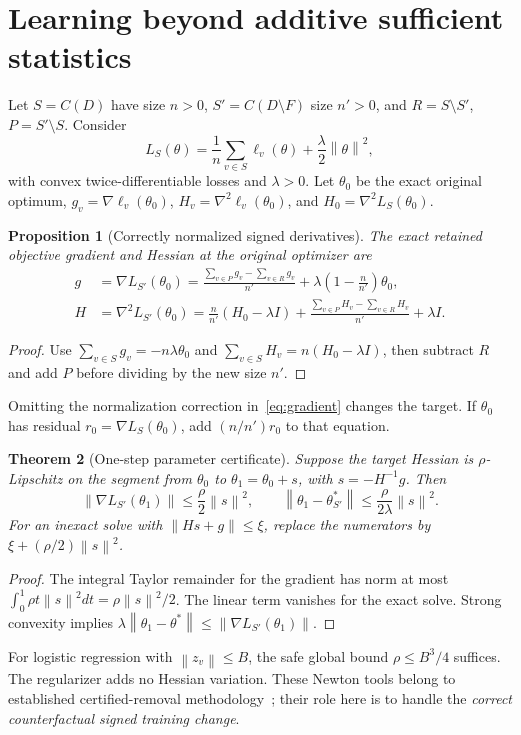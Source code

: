 \documentclass[11pt,a4paper]{article}
\newtheorem{theorem}{Theorem}[section]
\newtheorem{proposition}[theorem]{Proposition}
\theoremstyle{definition}\newtheorem{definition}[theorem]{Definition}
\newcommand{\norm}[1]{\left\lVert #1\right\rVert}
\newcommand{\minus}{\setminus}
\begin{document}
\section{Learning beyond additive sufficient statistics}\label{sec:convex}
Let $S=C(D)$ have size $n>0$, $S'=C(D\minus F)$ size $n'>0$, and $R=S\minus S'$, $P=S'\minus S$. Consider
\[
 L_S(\theta)=\frac1n\sum_{v\in S}\ell_v(\theta)+\frac\lambda2\norm\theta^2,
\]
with convex twice-differentiable losses and $\lambda>0$. Let $\theta_0$ be the exact original optimum, $g_v=\nabla\ell_v(\theta_0)$, $H_v=\nabla^2\ell_v(\theta_0)$, and $H_0=\nabla^2L_S(\theta_0)$.

\begin{proposition}[Correctly normalized signed derivatives]\label{prop:derivatives}
The exact retained objective gradient and Hessian at the original optimizer are
\begin{align}
 g&=\nabla L_{S'}(\theta_0)
 =\frac{\sum_{v\in P}g_v-\sum_{v\in R}g_v}{n'}
   +\lambda\left(1-\frac n{n'}\right)\theta_0,\label{eq:gradient}\\
 H&=\nabla^2L_{S'}(\theta_0)
 =\frac n{n'}(H_0-\lambda I)
 +\frac{\sum_{v\in P}H_v-\sum_{v\in R}H_v}{n'}+\lambda I.
 \label{eq:hessian}
\end{align}
\end{proposition}
\begin{proof}
Use $\sum_{v\in S}g_v=-n\lambda\theta_0$ and
$\sum_{v\in S}H_v=n(H_0-\lambda I)$, then subtract $R$ and add $P$ before dividing by the new size $n'$.
\end{proof}
Omitting the normalization correction in~\eqref{eq:gradient} changes the target. If $\theta_0$ has residual $r_0=\nabla L_S(\theta_0)$, add $(n/n')r_0$ to that equation.

\begin{theorem}[One-step parameter certificate]\label{thm:newton}
Suppose the target Hessian is $\rho$-Lipschitz on the segment from $\theta_0$ to $\theta_1=\theta_0+s$, with $s=-H^{-1}g$. Then
\begin{equation}
 \norm{\nabla L_{S'}(\theta_1)}\le\frac\rho2\norm{s}^2,
 \qquad
 \norm{\theta_1-\theta^*_{S'}}\le\frac\rho{2\lambda}\norm{s}^2.
\end{equation}
For an inexact solve with $\norm{Hs+g}\le\xi$, replace the numerators by $\xi+(\rho/2)\norm{s}^2$.
\end{theorem}
\begin{proof}
The integral Taylor remainder for the gradient has norm at most
$\int_0^1\rho t\norm{s}^2dt=\rho\norm{s}^2/2$. The linear term vanishes for the exact solve. Strong convexity implies
$\lambda\norm{\theta_1-\theta^*}\le\norm{\nabla L_{S'}(\theta_1)}$.
\end{proof}
For logistic regression with $\norm{z_v}\le B$, the safe global bound $\rho\le B^3/4$ suffices. The regularizer adds no Hessian variation. These Newton tools belong to established certified-removal methodology~\cite{guo2020}; their role here is to handle the \emph{correct counterfactual signed training change}.
\end{document}
